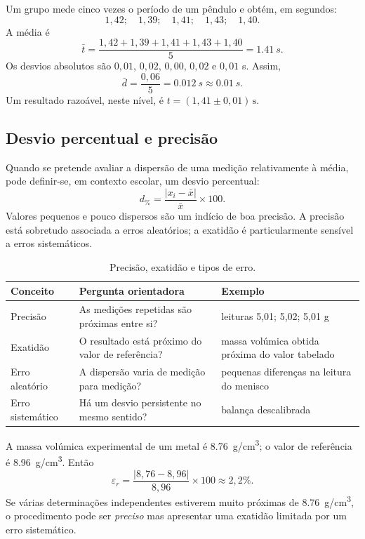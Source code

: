 \documentclass[11pt,a4paper,oneside]{book}
\begin{document}
\begin{exemplo}
Um grupo mede cinco vezes o período de um pêndulo e obtém, em segundos:
\[
1{,}42;\quad1{,}39;\quad1{,}41;\quad1{,}43;\quad1{,}40.
\]
A média é
\[
\bar t=\frac{1{,}42+1{,}39+1{,}41+1{,}43+1{,}40}{5}=\SI{1.41}{s}.
\]
Os desvios absolutos são $0{,}01$, $0{,}02$, $0{,}00$, $0{,}02$ e $0{,}01$ s. Assim,
\[
\bar d=\frac{0{,}06}{5}=\SI{0.012}{s}\approx\SI{0.01}{s}.
\]
Um resultado razoável, neste nível, é $t=(1{,}41\pm0{,}01)\,\mathrm{s}$.
\end{exemplo}

\subsection*{Desvio percentual e precisão}
Quando se pretende avaliar a dispersão de uma medição relativamente à média, pode definir-se, em contexto escolar, um desvio percentual:
\[
d_{\%}=\frac{|x_i-\bar{x}|}{\bar{x}}\times100.
\]
Valores pequenos e pouco dispersos são um indício de boa precisão. A precisão está sobretudo associada a erros aleatórios; a exatidão é particularmente sensível a erros sistemáticos.

\begin{table}[H]
\centering
\caption{Precisão, exatidão e tipos de erro.}
\renewcommand{\arraystretch}{1.18}\begin{tabularx}{\textwidth}{lXX}
\toprule
Conceito & Pergunta orientadora & Exemplo \\
\midrule
Precisão & As medições repetidas são próximas entre si? & leituras 5,01; 5,02; 5,01 g \\
Exatidão & O resultado está próximo do valor de referência? & massa volúmica obtida próxima do valor tabelado \\
Erro aleatório & A dispersão varia de medição para medição? & pequenas diferenças na leitura do menisco \\
Erro sistemático & Há um desvio persistente no mesmo sentido? & balança descalibrada \\
\bottomrule
\end{tabularx}\renewcommand{\arraystretch}{1.0}
\end{table}

\begin{exemplo}[title=Exemplo resolvido -- erro relativo e precisão]
A massa volúmica experimental de um metal é \SI{8.76}{g/cm^3}; o valor de referência é \SI{8.96}{g/cm^3}. Então
\[
\varepsilon_r=\frac{|8{,}76-8{,}96|}{8{,}96}\times100\approx2{,}2\%.
\]
Se várias determinações independentes estiverem muito próximas de \SI{8.76}{g/cm^3}, o procedimento pode ser \emph{preciso} mas apresentar uma exatidão limitada por um erro sistemático.
\end{exemplo}
\end{document}
